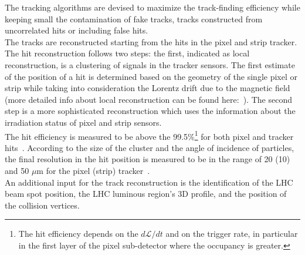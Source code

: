 The tracking algorithms are devised to
maximize the track-finding efficiency while keeping small the
contamination of fake tracks, \ie tracks constructed from uncorrelated hits or
including false hits.\\
 The tracks are reconstructed starting from the hits in the pixel and
strip tracker. The hit reconstruction follows two steps: the first,
indicated as local reconstruction, is a clustering of signals in the
tracker sensors. The first estimate of the
position of a hit is determined based on the geometry of the single
pixel or strip while taking into consideration the Lorentz drift due
to the magnetic field (more detailed info about local reconstruction
can be found here:~\cite{CMS:particleflow}). The second step is a more
sophisticated reconstruction which uses the information about the
irradiation status of pixel and strip sensors. \\
The hit efficiency is measured to be above the 99.5\%\footnote{The hit
  efficiency depends on the
$d\mathcal{L}/dt$ and on the trigger rate, in particular in
the first layer of the pixel sub-detector where the occupancy is greater.} for both pixel
and tracker hits~\cite{CMS:particleflow}. According to the size of the
cluster and the angle of
incidence of particles, the final resolution in the
hit position is measured to be in the range of 20 (10) and 50 $\mu$m
for the pixel (strip) tracker~\cite{CMS:particleflow}.\\
An additional input for the track reconstruction is the identification
of the LHC beam spot position, \ie the LHC luminous region's
3D profile, and the position of the collision
vertices. \\

